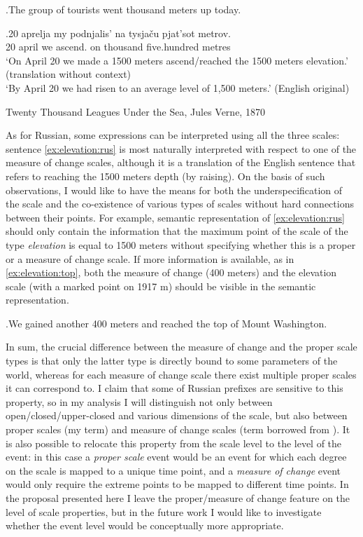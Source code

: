 \ex.\label{ex:elevation}The group of tourists went thousand meters up today.

\exg.\label{ex:elevation:rus}20 aprelja my podnjalis' na tysja\v{c}u pjat'sot metrov.\\
20 april we ascend. on thousand five.hundred metres\\
\vspace{0.5em}
`On April 20 we made a 1500 meters ascend/reached the 1500 meters elevation.' (translation without context)\\
`By April 20 we had risen to an average level of 1,500 meters.' (English original)\\
\begin{flushright}
\vspace{-0.5em}
Twenty Thousand Leagues Under the Sea, Jules Verne, 1870
\end{flushright}

As for Russian, some expressions can be interpreted using all the three scales: sentence \ref{ex:elevation:rus} is most naturally interpreted with respect to one of the measure of change scales, although it is a translation of the English sentence that refers to reaching the 1500 meters depth (by raising). On the basis of such observations, I would like to have the means for both the underspecification of the scale and the co-existence of various types of scales without hard connections between their points. For example, semantic representation of \ref{ex:elevation:rus} should only contain the information that the maximum point of the scale of the type \textit{elevation} is equal to 1500 meters without specifying whether this is a proper or a measure of change scale. If more information is available, as in \ref{ex:elevation:top}, both the measure of change (400 meters) and the elevation scale (with a marked point on 1917 m) should be visible in the semantic representation.

\ex.\label{ex:elevation:top}We gained another 400 meters and reached the top of Mount Washington.

In sum, the crucial difference between the measure of change and the proper scale types is that only the latter type is directly bound to some parameters of the world, whereas for each measure of change scale there exist multiple proper scales it can correspond to. I claim that some of Russian prefixes are sensitive to this property, so in my analysis I will distinguish not only between open/closed/upper-closed and various dimensions of the scale, but also between proper scales (my term) and measure of change scales (term borrowed from \citealt{KennedyLevin:08}). It is also possible to relocate this property from the scale level to the level of the event: in this case a \textit{proper scale} event would be an event for which each degree on the scale is mapped to a unique time point, and a \textit{measure of change} event would only require the extreme points to be mapped to different time points. In the proposal presented here I leave the proper/measure of change feature on the level of scale properties, but in the future work I would like to investigate whether the event level would be conceptually more appropriate.

